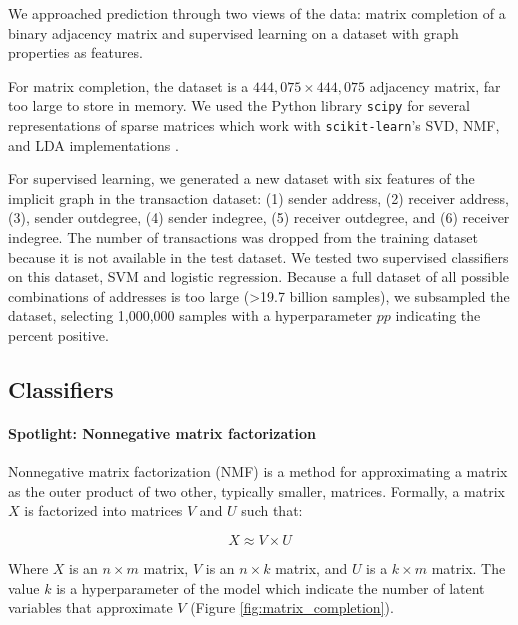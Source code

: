 \documentclass{article} %
\begin{document}
We approached prediction through two views of the data: matrix completion of a binary adjacency matrix and supervised learning on a dataset with graph properties as features.

For matrix completion, the dataset is a $444,075 \times 444,075$ adjacency matrix, far too large to store in memory. We used the Python library \texttt{scipy} for several representations of sparse matrices which work with \texttt{scikit-learn}'s SVD, NMF, and LDA implementations \cite{jones2014scipy} \cite{scikit-learn}.

For supervised learning, we generated a new dataset with six features of the implicit graph in the transaction dataset: (1) sender address, (2) receiver address, (3), sender outdegree, (4) sender indegree, (5) receiver outdegree, and (6) receiver indegree. The number of transactions was dropped from the training dataset because it is not available in the test dataset. We tested two supervised classifiers on this dataset, SVM and logistic regression. Because a full dataset of all possible combinations of addresses is too large (>19.7 billion samples), we subsampled the dataset, selecting 1,000,000 samples with a hyperparameter $pp$ indicating the percent positive.

\subsection{Classifiers}\label{classifiers}

\paragraph{Spotlight: Nonnegative matrix factorization}

Nonnegative matrix factorization (NMF) is a method for approximating a matrix as the outer product of two other, typically smaller, matrices. Formally, a matrix $X$ is factorized into matrices $V$ and $U$ such that:

\begin{equation} \label{eq:1}
X \approx V \times U
\end{equation}

Where $X$ is an $n \times m$ matrix, $V$ is an $n \times k$ matrix, and $U$ is a $k \times m$ matrix. The value $k$ is a hyperparameter of the model which indicate the number of latent variables that approximate $V$ (Figure \ref{fig:matrix_completion}).
\end{document}
